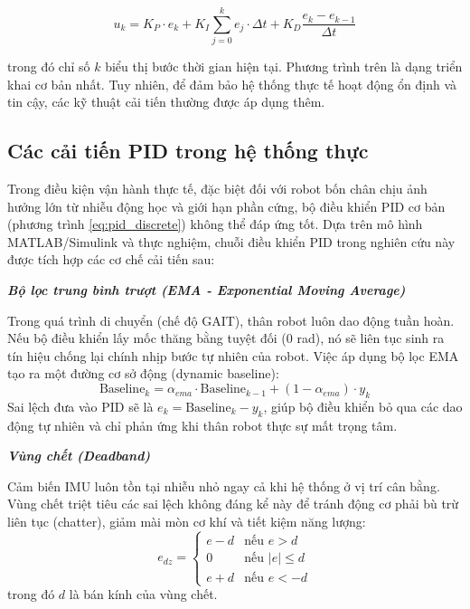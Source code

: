 \begin{equation}
    u_k = K_P \cdot e_k + K_I \sum_{j=0}^{k} e_j \cdot \Delta t + K_D \frac{e_k - e_{k-1}}{\Delta t}
    \label{eq:pid_discrete}
\end{equation}

trong đó chỉ số $k$ biểu thị bước thời gian hiện tại. Phương trình trên là dạng triển khai cơ bản nhất. Tuy nhiên, để đảm bảo hệ thống thực tế hoạt động ổn định và tin cậy, các kỹ thuật cải tiến thường được áp dụng thêm.

\subsection{Các cải tiến PID trong hệ thống thực}

Trong điều kiện vận hành thực tế, đặc biệt đối với robot bốn chân chịu ảnh hưởng lớn từ nhiễu động học và giới hạn phần cứng, bộ điều khiển PID cơ bản (phương trình \ref{eq:pid_discrete}) không thể đáp ứng tốt. Dựa trên mô hình MATLAB/Simulink và thực nghiệm, chuỗi điều khiển PID trong nghiên cứu này được tích hợp các cơ chế cải tiến sau:

\textbf{\textit{Bộ lọc trung bình trượt (EMA - Exponential Moving Average)}}

Trong quá trình di chuyển (chế độ GAIT), thân robot luôn dao động tuần hoàn. Nếu bộ điều khiển lấy mốc thăng bằng tuyệt đối (0 rad), nó sẽ liên tục sinh ra tín hiệu chống lại chính nhịp bước tự nhiên của robot. Việc áp dụng bộ lọc EMA tạo ra một đường cơ sở động (dynamic baseline):
\begin{equation}
    \text{Baseline}_k = \alpha_{ema} \cdot \text{Baseline}_{k-1} + (1 - \alpha_{ema}) \cdot y_k
\end{equation}
Sai lệch đưa vào PID sẽ là $e_k = \text{Baseline}_k - y_k$, giúp bộ điều khiển bỏ qua các dao động tự nhiên và chỉ phản ứng khi thân robot thực sự mất trọng tâm.

\textbf{\textit{Vùng chết (Deadband)}}

Cảm biến IMU luôn tồn tại nhiễu nhỏ ngay cả khi hệ thống ở vị trí cân bằng. Vùng chết triệt tiêu các sai lệch không đáng kể này để tránh động cơ phải bù trừ liên tục (chatter), giảm mài mòn cơ khí và tiết kiệm năng lượng:
\begin{equation}
    e_{dz} = \begin{cases}
        e - d & \text{nếu } e > d \\
        0 & \text{nếu } |e| \leq d \\
        e + d & \text{nếu } e < -d
    \end{cases}
\end{equation}
trong đó $d$ là bán kính của vùng chết.

